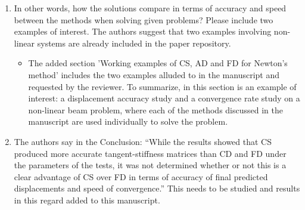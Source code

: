\documentclass{article}
\begin{document}
\begin{enumerate}
\item 
      In other words, how the solutions compare in terms of accuracy and speed between the methods when
      solving given problems? Please include two examples of interest. The authors
      suggest that two examples involving non-linear systems are already included in the
      paper repository.

{\color{red}
  \begin{itemize}
    \item 
        The added section 'Working examples of CS, AD and FD for Newton's method' includes
        the two examples alluded to in the manuscript and requested by the reviewer. 
        To summarize, in this section is an example of interest: a displacement accuracy study and 
        a convergence rate study on a non-linear beam problem, where each of the methods
        discussed in the manuscript are used individually to solve the problem. 
 \end{itemize}}

\item
      The authors say in the Conclusion: “While the results showed that CS
      produced more accurate tangent-stiffness matrices than CD and FD under
      the parameters of the tests, it was not determined whether or not this is
      a clear advantage of CS over FD in terms of accuracy of final predicted
      displacements and speed of convergence.” This needs to be studied and
      results in this regard added to this manuscript.


\end{enumerate}
\end{document}

